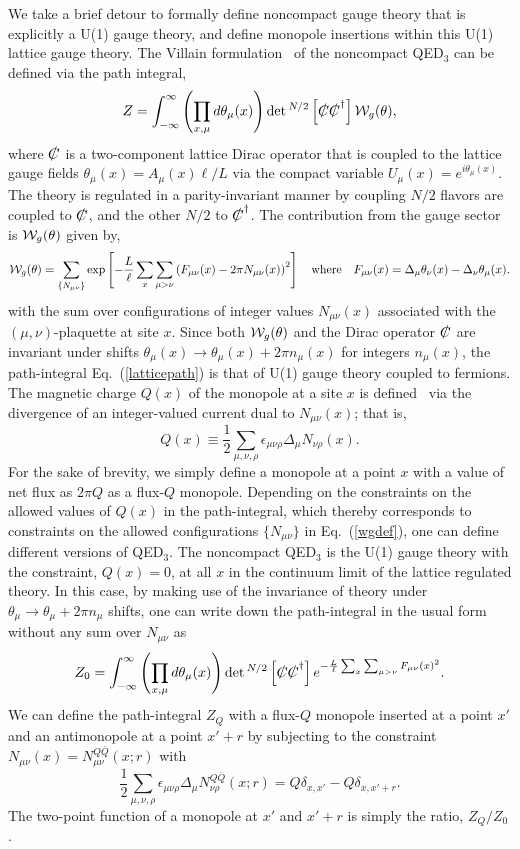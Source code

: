 \documentclass[prd, onecolumn, superscriptaddress, nofootinbib, notitlepage, floatfix]{revtex4-1}
\newcommand\beq{\begin{equation}}
\newcommand\eeq[1]{\label{#1}\end{equation}}
\newcommand\eqn[1]{Eq.\ (\ref{#1})}
\begin{document}
We take a brief detour to formally define noncompact gauge theory
that is explicitly a U(1) gauge theory, and define monopole insertions
within this U(1) lattice gauge theory.  The Villain
formulation~\cite{Villain:1974ir} of the noncompact QED$_3$ can be
defined via the path integral,
\beq
Z= \int_{-\infty}^\infty \left(\prod_{x,\mu} d\theta_\mu(x)\right) \det{}^{N/2}\left[\slashed{C}\slashed{C}^\dagger\right] {\cal W}_g(\theta),
\eeq{latticepath}
where $\slashed{C}$ is a two-component lattice Dirac operator that
is coupled to the lattice gauge fields $\theta_\mu(x) = A_\mu(x)
\ell/L$ via the compact variable $U_\mu(x) = e^{i\theta_\mu(x)}$.
The theory is regulated in a parity-invariant manner by coupling
$N/2$ flavors are coupled to $\slashed{C}$, and the other $N/2$ to
$\slashed{C}^\dagger$. The contribution from the gauge sector is
${\cal W}_g(\theta)$ given by,
\beq
{\cal W}_g(\theta) = \sum_{\{N_{\mu\nu}\}}\exp\left[-\frac{L}{\ell}\sum_{x}\sum_{\mu>\nu}\left(F_{\mu\nu}(x) - 2\pi N_{\mu\nu}(x)\right)^2\right]\quad\text{where}\quad
F_{\mu\nu}(x) = \Delta_\mu\theta_\nu(x)-\Delta_\nu\theta_\mu(x).
\eeq{wgdef}
with the sum over configurations of integer values $N_{\mu\nu}(x)$
associated with the $(\mu,\nu)$-plaquette at site $x$.  Since both
${\cal W}_g(\theta)$ and the Dirac operator $\slashed{C}$ are
invariant under shifts $\theta_\mu(x) \to \theta_\mu(x) + 2\pi
n_\mu(x)$ for integers $n_\mu(x)$, the path-integral \eqn{latticepath}
is that of U(1) gauge theory coupled to fermions.  The magnetic
charge $Q(x)$ of the monopole at a site $x$ is
defined~\cite{DeGrand:1980eq} via the divergence of an integer-valued
current dual to $N_{\mu\nu}(x)$; that is,
\beq
Q(x) \equiv \frac{1}{2}\sum_{\mu,\nu,\rho}\epsilon_{\mu\nu\rho}\Delta_{\mu}N_{\nu\rho}(x).
\eeq{monocharge}
For the sake of brevity, we simply define a monopole at a point $x$
with a value of net flux as $2\pi Q$ as a flux-$Q$ monopole.
Depending on the constraints on the allowed values of $Q(x)$ in the
path-integral, which thereby corresponds to constraints on the
allowed configurations $\{N_{\mu\nu}\}$ in \eqn{wgdef}, one can
define different versions of QED$_3$.  The noncompact QED$_3$ is
the U(1) gauge theory with the constraint, $Q(x)=0$, at all $x$ in
the continuum limit of the lattice regulated theory. In this case,
by making use of the invariance of theory under $\theta_\mu \to
\theta_\mu + 2\pi n_\mu$ shifts, one can write down the path-integral
in the usual form without any sum over $N_{\mu\nu}$ as
\beq
Z_0 = \int_{-\infty}^\infty \left(\prod_{x,\mu} d\theta_\mu(x)\right) \det{}^{N/2}\left[\slashed{C}\slashed{C}^\dagger\right] e^{-\frac{L}{\ell} \sum_{x}\sum_{\mu>\nu}F_{\mu\nu}(x)^2}.
\eeq{normalpath}
We can define the path-integral $Z_Q$ with a flux-$Q$ monopole inserted at a point $x'$ and an antimonopole at a point $x'+r$ by subjecting to the constraint $N_{\mu\nu}(x)=N^{Q\bar Q}_{\mu\nu}(x;r)$ with
\beq
\frac{1}{2}\sum_{\mu,\nu,\rho}\epsilon_{\mu\nu\rho}\Delta_{\mu} N^{Q\bar Q}_{\nu\rho}(x;r) = Q \delta_{x,x'} - Q \delta_{x,x'+r}.
\eeq{Nconstraint}
The two-point function of a monopole at $x'$ and $x'+r$ is simply
the ratio, $Z_Q/Z_0$.
\end{document}
